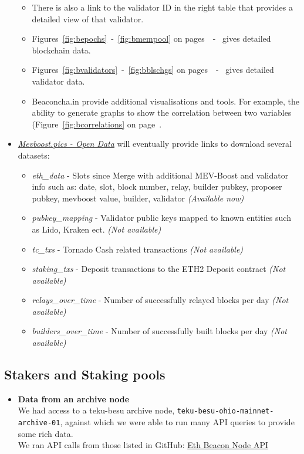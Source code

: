 \documentclass[UTF8]{article}
\begin{document}
\begin{itemize}
\begin{itemize}
		\item There is also a link to the validator ID in the right table that provides a detailed view of that validator.
		\item Figures~\ref{fig:bepochs}~-~\ref{fig:bmempool} on pages~\pageref{fig:bepochs}~-~\pageref{fig:bmempool} gives detailed blockchain data.
		\item Figures~\ref{fig:bvalidators}~-~\ref{fig:bblschgs} on pages~\pageref{fig:bvalidators}~-~\pageref{fig:bblschgs} gives detailed validator data.
		\item Beaconcha.in provide additional visualisations and tools. For example, the ability to generate graphs to show the correlation between two variables (Figure~\ref{fig:bcorrelations} on page~\pageref{fig:bcorrelations}.
	\end{itemize}

	\item \textit{\href{https://mevboost.pics/data.html}{Mevboost.pics - Open Data}} will eventually provide links to download several datasets: 
		\begin{itemize}
			\item \textit{eth\_data} - Slots since Merge with additional MEV-Boost and validator info such as: date, slot, block number, relay, builder pubkey, proposer pubkey, mevboost value, builder, validator \textit{(Available now)}
			\item \textit{pubkey\_mapping} - Validator public keys mapped to known entities such as Lido, Kraken ect. \textit{(Not available)}
			\item \textit{tc\_txs} - Tornado Cash related transactions \textit{(Not available)}
			\item \textit{staking\_txs} - Deposit transactions to the ETH2 Deposit contract \textit{(Not available)}
			\item \textit{relays\_over\_time} - Number of successfully relayed blocks per day \textit{(Not available)}
			\item \textit{builders\_over\_time} - Number of successfully built blocks per day \textit{(Not available)}
		\end{itemize}
\end{itemize}
\subsection{Stakers and Staking pools}
\label{sec:stakers}
\begin{itemize}
	\item \textbf{Data from an archive node} \\
	We had access to a teku-besu archive node, \texttt{teku-besu-ohio-mainnet-archive-01},  against which we were able to run many API queries to provide some rich data.\\
	 We ran API calls from those listed in GitHub: \href{https://ethereum.github.io/beacon-APIs/?urls.primaryName=dev}{Eth Beacon Node API}
\end{itemize}
\clearpage
\end{document}
